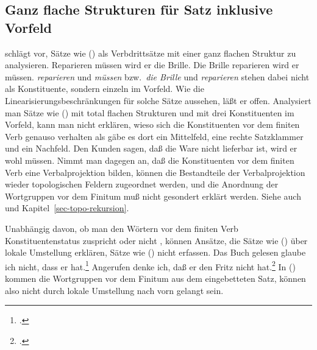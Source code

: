 


\subsection{Ganz flache Strukturen für Satz inklusive Vorfeld}
\label{sec-pvp-vdrei}

\citet[--171]{Gunkel2003b} schlägt vor, Sätze wie () als Verbdrittsätze
mit einer ganz flachen Struktur zu analysieren.
\eal
\ex Reparieren müssen wird er die Brille.
\ex Die Brille reparieren wird er müssen.
\zl 
\emph{reparieren} und \emph{müssen} bzw.\ \emph{die Brille} und \emph{reparieren}
stehen dabei nicht als Konstituente, sondern einzeln im Vorfeld.
Wie die Linearisierungsbeschränkungen
für solche Sätze aussehen, läßt er offen. Analysiert man Sätze wie () mit total
flachen Strukturen und mit drei Konstituenten im Vorfeld, kann man nicht erklären,
wieso sich die Konstituenten vor dem finiten Verb genauso verhalten als gäbe es dort
ein Mittelfeld, eine rechte Satzklammer und ein Nachfeld.
\ea
Den Kunden sagen, daß die Ware nicht lieferbar ist, wird er wohl müssen.
\z
Nimmt man dagegen an, daß die Konstituenten vor dem finiten Verb eine Verbalprojektion
bilden, können die Bestandteile der Verbalprojektion wieder topologischen Feldern
zugeordnet werden, und die Anordnung der Wortgruppen vor dem Finitum muß nicht gesondert
erklärt werden. Siehe auch  und Kapitel~\ref{sec-topo-rekursion}.

Unabhängig davon, ob man den Wörtern vor dem finiten Verb Konstituentenstatus
zuspricht \citep{Kathol95a} oder nicht \citep{Gunkel2003b}, können Ansätze,
die Sätze wie () über lokale Umstellung erklären, Sätze wie ()
nicht erfassen.
\eal
\ex Das Buch gelesen glaube ich nicht, dass er hat.\footnote{
  .
}
\ex Angerufen denke ich, daß er den Fritz nicht hat.\footnote{
  .
}
\zl
In () kommen die Wortgruppen vor dem Finitum aus dem eingebetteten Satz,
können also nicht durch lokale Umstellung nach vorn gelangt sein.

